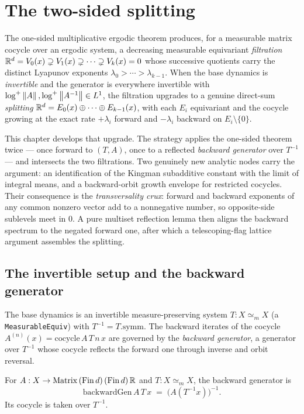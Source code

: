 \chapter{The two-sided splitting}
\label{chap:twosided}

The one-sided multiplicative ergodic theorem produces, for a measurable matrix cocycle over an ergodic system, a decreasing measurable equivariant \emph{filtration} \(\mathbb{R}^d = V_0(x) \supsetneq V_1(x) \supsetneq \cdots \supsetneq V_k(x) = 0\) whose successive quotients carry the distinct Lyapunov exponents \(\lambda_0 > \cdots > \lambda_{k-1}\). When the base dynamics is \emph{invertible} and the generator is everywhere invertible with \(\log^+\left\lVert A \right\rVert, \log^+\left\lVert A^{-1} \right\rVert \in L^1\), the filtration upgrades to a genuine direct-sum \emph{splitting} \(\mathbb{R}^d = E_0(x) \oplus \cdots \oplus E_{k-1}(x)\), with each \(E_i\) equivariant and the cocycle growing at the exact rate \(+\lambda_i\) forward and \(-\lambda_i\) backward on \(E_i \setminus \{0\}\).

This chapter develops that upgrade. The strategy applies the one-sided theorem twice — once forward to \((T, A)\), once to a reflected \emph{backward generator} over \(T^{-1}\) — and intersects the two filtrations. Two genuinely new analytic nodes carry the argument: an identification of the Kingman subadditive constant with the limit of integral means, and a backward-orbit growth envelope for restricted cocycles. Their consequence is the \emph{transversality crux}: forward and backward exponents of any common nonzero vector add to a nonnegative number, so opposite-side sublevels meet in \(0\). A pure multiset reflection lemma then aligns the backward spectrum to the negated forward one, after which a telescoping-flag lattice argument assembles the splitting.

\section{The invertible setup and the backward generator}

The base dynamics is an invertible measure-preserving system \(T : X \simeq_m X\) (a \texttt{MeasurableEquiv}) with \(T^{-1} = T.\mathrm{symm}\). The backward iterates of the cocycle \(A^{(n)}(x) = \mathrm{cocycle}\,A\,T\,n\,x\) are governed by the \emph{backward generator}, a generator over \(T^{-1}\) whose cocycle reflects the forward one through inverse and orbit reversal.

\begin{definition}\label{backwardGen}
  \leanok
  For \(A : X \to \mathrm{Matrix}\,(\mathrm{Fin}\,d)\,(\mathrm{Fin}\,d)\,\mathbb{R}\) and \(T : X \simeq_m X\), the backward generator is
  \[
    \mathrm{backwardGen}\,A\,T\,x \;=\; \bigl(A(T^{-1}x)\bigr)^{-1}.
  \]
  Its cocycle is taken over \(T^{-1}\).
\end{definition}

